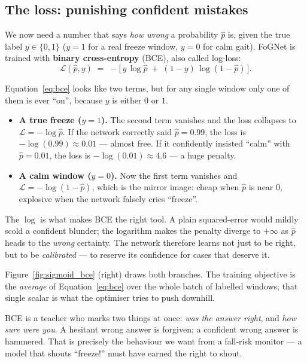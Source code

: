 \subsection{The loss: punishing confident mistakes}

We now need a number that says \emph{how wrong} a probability $\hat p$ is, given the
true label $y \in \{0,1\}$ ($y=1$ for a real freeze window, $y=0$ for calm gait).
FoGNet is trained with \textbf{binary cross-entropy} (BCE), also called log-loss:
\begin{equation}
\mathcal{L}(\hat p, y) \;=\; -\Big[\, y\,\log \hat p \;+\; (1-y)\,\log(1-\hat p)\,\Big].
\label{eq:bce}
\end{equation}

\begin{mathsbox}
Equation~\eqref{eq:bce} looks like two terms, but for any single window only one of
them is ever ``on'', because $y$ is either $0$ or $1$.
\begin{itemize}
  \item \textbf{A true freeze ($y=1$).} The second term vanishes and the loss collapses
  to $\mathcal{L} = -\log \hat p$. If the network correctly said $\hat p = 0.99$, the
  loss is $-\log(0.99)\approx 0.01$ --- almost free. If it confidently insisted
  ``calm'' with $\hat p = 0.01$, the loss is $-\log(0.01)\approx 4.6$ --- a huge
  penalty.
  \item \textbf{A calm window ($y=0$).} Now the first term vanishes and
  $\mathcal{L} = -\log(1-\hat p)$, which is the mirror image: cheap when $\hat p$ is
  near $0$, explosive when the network falsely cries ``freeze''.
\end{itemize}
The $\log$ is what makes BCE the right tool. A plain squared-error would mildly scold a
confident blunder; the logarithm makes the penalty diverge to $+\infty$ as $\hat p$
heads to the \emph{wrong} certainty. The network therefore learns not just to be right,
but to be \emph{calibrated} --- to reserve its confidence for cases that deserve it.
\end{mathsbox}

Figure~\ref{fig:sigmoid_bce} (right) draws both branches. The training objective is the
\emph{average} of Equation~\eqref{eq:bce} over the whole batch of labelled windows; that
single scalar is what the optimiser tries to push downhill.

\begin{intuition}
BCE is a teacher who marks two things at once: \emph{was the answer right}, and
\emph{how sure were you}. A hesitant wrong answer is forgiven; a confident wrong answer
is hammered. That is precisely the behaviour we want from a fall-risk monitor --- a
model that shouts ``freeze!'' must have earned the right to shout.
\end{intuition}

